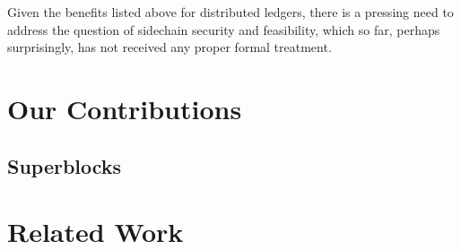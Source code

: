 Given the benefits listed above for distributed ledgers, there is a pressing
need to address the question of sidechain security and feasibility, which so far, perhaps surprisingly, has not received any proper formal treatment.

\section{Our Contributions}
\subsection{Superblocks}


\section{Related Work}
